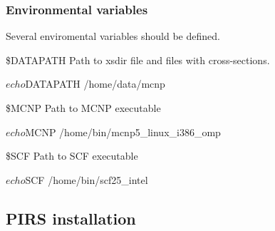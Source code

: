 \begin{frame}[fragile]
    \frametitle{Environmental variables}
    Several enviromental variables should be defined.

    \begin{block}{\$DATAPATH}
        Path to xsdir file and files with cross-sections.

        \begin{bashcode}
            $ echo $DATAPATH
            /home/data/mcnp
        \end{bashcode}
    \end{block}

    \begin{block}{\$MCNP}
        Path to MCNP executable

        \begin{bashcode}
            $ echo $MCNP
            /home/bin/mcnp5_linux_i386_omp
        \end{bashcode}
    \end{block}

    \begin{block}{\$SCF}
        Path to SCF executable

        \begin{bashcode}
            $ echo $SCF
            /home/bin/scf25_intel
        \end{bashcode}
    \end{block}
\end{frame}

\subsection{PIRS installation}

